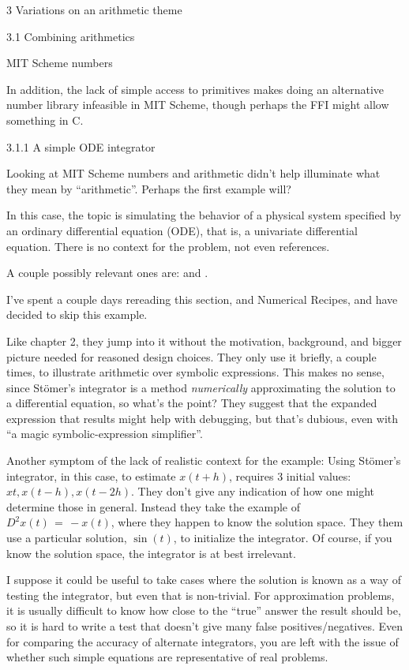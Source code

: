 \documentclass[12pt]{PalisadesLakesBook}
\begin{document}
\begin{plSection}{3 Variations on an arithmetic theme}
\begin{plSection}{3.1 Combining arithmetics}
\begin{plSection}{MIT Scheme numbers}
\begin{description}
In addition, the lack of simple access to primitives
makes doing an alternative number library infeasible
in MIT Scheme, though perhaps the FFI might allow something
in C.~\cite{Birkholz:2018:MITSchemeSOS}
\end{description}

\end{plSection}%
\begin{plSection}{3.1.1 A simple ODE integrator}

Looking at MIT Scheme numbers and arithmetic didn't help
illuminate what they mean by ``arithmetic''.
Perhaps the first example will?

In this case, the topic is simulating the behavior 
of a physical system specified by an ordinary differential
equation (ODE), that is, a univariate differential equation.
There is no context for the problem, not even references.

A couple possibly relevant ones are: 
and
.

I've spent a couple days rereading this section,
and Numerical Recipes, and have decided to skip this example.

Like chapter 2, they jump into it
without the motivation, background, and bigger picture 
needed for reasoned design choices.
They only use it briefly, a couple times,
to illustrate arithmetic over symbolic expressions.
This makes no sense, since St\"{o}mer's integrator
is a method \emph{numerically} approximating the solution
to a differential equation, so what's the point?
They suggest that the expanded expression that results might
help with debugging, but that's dubious, even with 
``a magic symbolic-expression 
simplifier''.~\cite[p 96]{HansonSussman:2021:SDFF}

Another symptom of the lack of realistic context for the example: 
Using St\"{o}mer's integrator, in this case,
to estimate $x(t+h)$, requires 
3 initial values: $x{t}, x(t-h), x(t-2h)$.
They don't give any indication of how one might determine those
in general.
Instead they take the example of $D^{2} x(t) \,=\, - x(t)$,
where they happen to know the solution space. 
They them use a particular solution, $\sin (t)$,
to initialize the integrator.
Of course, if you know the solution space, the integrator is
at best irrelevant.

I suppose it could be useful to take cases where the solution 
is known as a way of testing the integrator,
but even that is non-trivial.
For approximation problems, it is usually difficult to know how
close to the ``true'' answer the result should be,
so it is hard to write a test that doesn't give many false
positives/negatives.
Even for comparing the accuracy of alternate integrators,
you are left with the issue of whether such simple equations
are representative of real problems.


\end{plSection}
\end{plSection}
\end{plSection}
\end{document}
